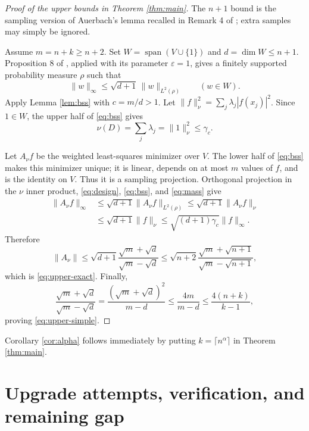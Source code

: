 \documentclass[11pt]{article}
\begin{document}
\begin{proof}[Proof of the upper bounds in Theorem \ref{thm:main}]
The $n+1$ bound is the sampling version of Auerbach's lemma recalled in
Remark 4 of \cite{KPUU}; extra samples may simply be ignored.

Assume $m=n+k\geq n+2$.  Set $W=\operatorname{span}(V\cup\{1\})$ and
$d=\dim W\leq n+1$.  Proposition 8 of \cite{KPUU}, applied with its
parameter $\varepsilon=1$, gives a finitely supported probability measure
$\rho$ such that
\begin{equation}\label{eq:design}
 \|w\|_\infty\leq\sqrt{d+1}\,\|w\|_{L^2(\rho)}
 \qquad(w\in W).
\end{equation}
Apply Lemma \ref{lem:bss} with $c=m/d>1$.  Let
\(\|f\|_\nu^2=\sum_j\lambda_j|f(x_j)|^2\).
Since $1\in W$, the upper half of \eqref{eq:bss} gives
\begin{equation}\label{eq:mass}
 \nu(D)=\sum_j\lambda_j=\|1\|_\nu^2\leq\gamma_c.
\end{equation}

Let $A_\nu f$ be the weighted least-squares minimizer over $V$.  The lower
half of \eqref{eq:bss} makes this minimizer unique; it is linear, depends on
at most $m$ values of $f$, and is the identity on $V$.  Thus it is a
sampling projection.  Orthogonal projection in the $\nu$ inner product,
\eqref{eq:design}, \eqref{eq:bss}, and \eqref{eq:mass} give
\begin{align*}
 \|A_\nu f\|_\infty
 &\leq\sqrt{d+1}\|A_\nu f\|_{L^2(\rho)}
 \leq\sqrt{d+1}\|A_\nu f\|_\nu\\
 &\leq\sqrt{d+1}\|f\|_\nu
 \leq\sqrt{(d+1)\gamma_c}\|f\|_\infty.
\end{align*}
Therefore
\[
 \|A_\nu\|
 \leq\sqrt{d+1}\frac{\sqrt m+\sqrt d}{\sqrt m-\sqrt d}
 \leq\sqrt{n+2}\frac{\sqrt m+\sqrt{n+1}}
                         {\sqrt m-\sqrt{n+1}},
\]
which is \eqref{eq:upper-exact}.  Finally,
\[
 \frac{\sqrt m+\sqrt d}{\sqrt m-\sqrt d}
 =\frac{(\sqrt m+\sqrt d)^2}{m-d}
 \leq\frac{4m}{m-d}
 \leq\frac{4(n+k)}{k-1},
\]
proving \eqref{eq:upper-simple}.
\end{proof}

Corollary \ref{cor:alpha} follows immediately by putting
$k=\lceil n^\alpha\rceil$ in Theorem \ref{thm:main}.

\section{Upgrade attempts, verification, and remaining gap}
\end{document}
